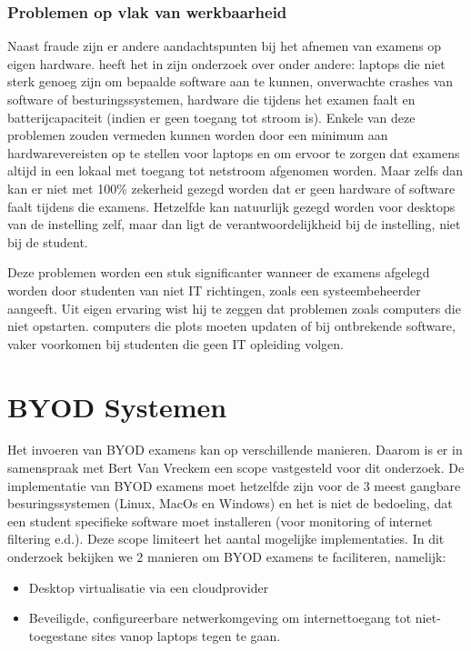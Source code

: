 \subsubsection{Problemen op vlak van werkbaarheid}
Naast fraude zijn er andere aandachtspunten bij het afnemen van examens op eigen hardware. \textcite{Hillier2015} heeft het in zijn onderzoek over onder andere: laptops die niet sterk genoeg zijn om bepaalde software aan te kunnen, onverwachte crashes van software of besturingssystemen, hardware die tijdens het examen faalt en batterijcapaciteit (indien er geen toegang tot stroom is). Enkele van deze problemen zouden vermeden kunnen worden door een minimum aan hardwarevereisten op te stellen voor laptops en om ervoor te zorgen dat examens altijd in een lokaal met toegang tot netstroom afgenomen worden. Maar zelfs dan kan er niet met 100\% zekerheid gezegd worden dat er geen hardware of software faalt tijdens die examens. Hetzelfde kan natuurlijk gezegd worden voor desktops van de instelling zelf, maar dan ligt de verantwoordelijkheid bij de instelling, niet bij de student. 

Deze problemen worden een stuk significanter wanneer de examens afgelegd worden door studenten van niet IT richtingen, zoals een systeembeheerder aangeeft. Uit eigen ervaring wist hij te zeggen dat problemen zoals computers die niet opstarten. computers die plots moeten updaten of bij ontbrekende software,  vaker voorkomen bij studenten die geen IT opleiding volgen. 


    
\section{BYOD Systemen}

Het invoeren van BYOD examens kan op verschillende manieren. Daarom is er in samenspraak met Bert Van Vreckem een scope vastgesteld voor dit onderzoek. De implementatie van BYOD examens moet hetzelfde zijn voor de 3 meest gangbare besuringssystemen (Linux, MacOs en Windows) en het is niet de bedoeling, dat een student specifieke software moet installeren (voor monitoring of internet filtering e.d.). Deze scope limiteert het aantal mogelijke implementaties. In dit onderzoek bekijken we 2 manieren om BYOD examens te faciliteren, namelijk:

\begin{itemize} 
\item Desktop virtualisatie via een cloudprovider
\item Beveiligde, configureerbare netwerkomgeving om internettoegang tot niet-toegestane sites vanop laptops tegen te gaan.	
\end{itemize}

